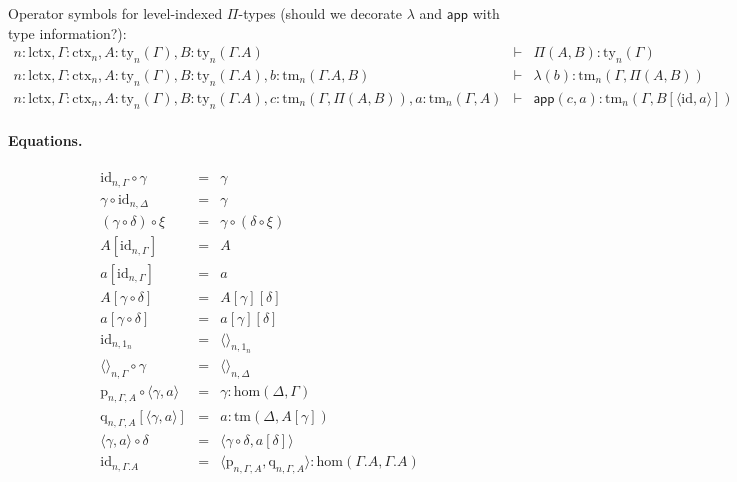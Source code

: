 \documentclass[11pt,a4paper]{article}
\theoremstyle{plain}
\theoremstyle{definition}
\newcommand{\id}{\mathsf{id}}
\newcommand{\app}[2]{{#1\,#2}} %
\def\sub{\mathrm{hom}}
\def\id{\mathrm{id}}
\def\lctx{\mathrm{lctx}}
\newcommand{\ctx}{\mathrm{ctx}}
\newcommand{\ty}{\mathrm{ty}}
\newcommand{\tm}{\mathrm{tm}}
\newcommand{\tuple}[1]{\langle #1 \rangle}
\newcommand{\cext}{.}
\def\p{\mathrm{p}}
\def\q{\mathrm{q}}
\def\app{\mathsf{app}}
\begin{document}
Operator symbols for level-indexed $\Pi$-types (should we decorate $\lambda$ and $\app$ with type information?):
\begin{eqnarray*}
n : \lctx, \Gamma : \ctx_n, A : \ty_n(\Gamma), B : \ty_n(\Gamma.A)&\vdash& \Pi(A,B) : \ty_n(\Gamma)\\
n : \lctx, \Gamma : \ctx_n, A : \ty_n(\Gamma), B : \ty_n(\Gamma.A), b : \tm_n(\Gamma.A, B) &\vdash& \lambda(b) : \tm_n(\Gamma,\Pi(A,B))\\
n : \lctx, \Gamma : \ctx_n, A : \ty_n(\Gamma), B : \ty_n(\Gamma.A), c :  \tm_n(\Gamma,\Pi(A,B)), a : \tm_n(\Gamma, A) &\vdash& \app(c,a) : \tm_n(\Gamma, B[\tuple{\id,a}])
\end{eqnarray*}

\paragraph{Equations.}
\begin{eqnarray*}
\id_{n,\Gamma} \circ \gamma &=& \gamma \\
 \gamma \circ \id_{n,\Delta} &=& \gamma \\
(\gamma \circ \delta) \circ \xi &=& \gamma \circ (\delta \circ \xi)\\
A[\id_{n,\Gamma}] &=& A
\\
a[\id_{n,\Gamma}] &=& a%
\\
A[\gamma\circ\delta] &=& A[\gamma][\delta]
\\
a[\gamma\circ\delta] &=& a[\gamma][\delta]
\\
\id_{n,1_n} &=& \tuple{}_{n,1_n}
\\
\tuple{}_{n,\Gamma}\circ\gamma &=& \tuple{}_{n,\Delta}%
\\
\p_{n,\Gamma,A}\circ\tuple{\gamma,a} &=& \gamma : \sub(\Delta,\Gamma)\\
\q_{n,\Gamma,A}[\tuple{\gamma,a}] &=& a : \tm(\Delta,A[\gamma]) \\
\tuple{\gamma,a} \circ \delta &=& \tuple{\gamma\circ\delta,a[\delta]} \\
\id_{n,\Gamma\cext A} &=& \tuple{\p_{n,\Gamma,A},\q_{n,\Gamma,A}} : \sub(\Gamma\cext A,\Gamma\cext A)
\end{eqnarray*}
\end{document}
